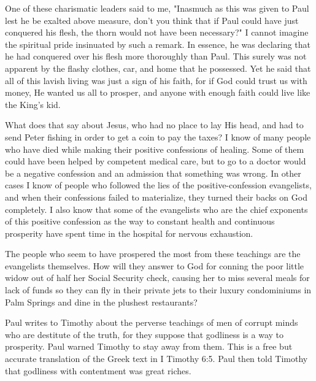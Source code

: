 One of these charismatic leaders said to me, "Inasmuch as this was given to Paul lest he be exalted above measure, don't you think that if Paul could have just conquered his flesh, the thorn would not have been necessary?" I cannot imagine the spiritual pride insinuated by such a remark. In essence, he was declaring that he had conquered over his flesh more thoroughly than Paul. This surely was not apparent by the flashy clothes, car, and home that he possessed. Yet he said that all of this lavish living was just a sign of his faith, for if God could trust us with money, He wanted us all to prosper, and anyone with enough faith could live like the King's kid. 

What does that say about Jesus, who had no place to lay His head, and had to send Peter fishing in order to get a coin to pay the taxes? I know of many people who have died while making their positive confessions of healing. Some of them could have been helped by competent medical care, but to go to a doctor would be a negative confession and an admission that something was wrong. In other cases I know of people who followed the lies of the positive-confession evangelists, and when their confessions failed to materialize, they turned their backs on God completely. I also know that some of the evangelists who are the chief exponents of this positive confession as the way to constant health and continuous prosperity have spent time in the hospital for nervous exhaustion. 

The people who seem to have prospered the most from these teachings are the evangelists themselves. How will they answer to God for conning the poor little widow out of half her Social Security check, causing her to miss several meals for lack of funds so they can fly in their private jets to their luxury condominiums in Palm Springs and dine in the plushest restaurants? 

Paul writes to Timothy about the perverse teachings of men of corrupt minds who are destitute of the truth, for they suppose that godliness is a way to prosperity. Paul warned Timothy to stay away from them. This is a free but accurate translation of the Greek text in I Timothy 6:5. Paul then told Timothy that godliness with contentment was great riches. 


